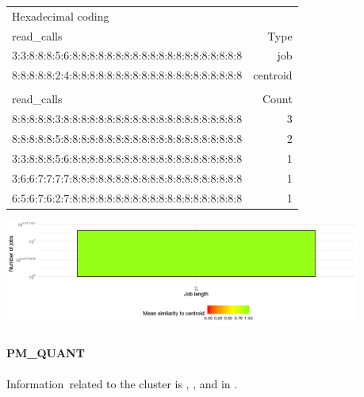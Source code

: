 \documentclass[]{llncs}
\begin{document}
\begingroup
  \centering
  \begin{tiny}
    \begin{tabular}{@{ }l@{ }|@{ }r@{ }}
      \rowcolor{tabhcolor}
      Hexadecimal coding & \\
      \rowcolor{tabhcolor}
      read\_calls                                           & Type     \\ 
      \hline	
      3:3:8:8:8:5:6:8:8:8:8:8:8:8:8:8:8:8:8:8:8:8:8:8:8:8:8 & job      \\ 
      8:8:8:8:8:2:4:8:8:8:8:8:8:8:8:8:8:8:8:8:8:8:8:8:8:8:8 & centroid \\ 
      \multicolumn{2}{l}{}\\ 
			\rowcolor{tabhcolor}
      read\_calls                                           & Count    \\ 
      \hline	
      8:8:8:8:8:3:8:8:8:8:8:8:8:8:8:8:8:8:8:8:8:8:8:8:8:8:8 & 3        \\ 
      8:8:8:8:8:5:8:8:8:8:8:8:8:8:8:8:8:8:8:8:8:8:8:8:8:8:8 & 2        \\ 
      3:3:8:8:8:5:6:8:8:8:8:8:8:8:8:8:8:8:8:8:8:8:8:8:8:8:8 & 1        \\ 
      3:6:6:7:7:7:7:8:8:8:8:8:8:8:8:8:8:8:8:8:8:8:8:8:8:8:8 & 1        \\ 
      6:5:6:7:6:2:7:8:8:8:8:8:8:8:8:8:8:8:8:8:8:8:8:8:8:8:8 & 1        \\ 
    \end{tabular}
  \end{tiny}
  \label{tab:use_case:hex_native:job_centroid}
\endgroup
\begingroup
  \centering
  \includegraphics[width=4.61in,height=1.39in]{./media/image2.png}
  \label{fig:use_case:hex_native:length}
\endgroup

\paragraph{PM\_QUANT}
Information\ related to the cluster is , , and in .
\end{document}
